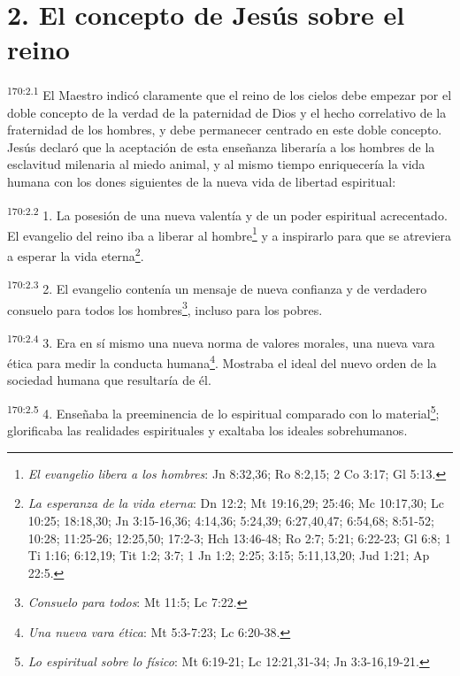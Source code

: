 \section*{2. El concepto de Jesús sobre el reino}
\par
\textsuperscript{170:2.1} El Maestro indicó claramente que el reino de los cielos debe empezar por el doble concepto de la verdad de la paternidad de Dios y el hecho correlativo de la fraternidad de los hombres, y debe permanecer centrado en este doble concepto. Jesús declaró que la aceptación de esta enseñanza liberaría a los hombres de la esclavitud milenaria al miedo animal, y al mismo tiempo enriquecería la vida humana con los dones siguientes de la nueva vida de libertad espiritual:

\par
\textsuperscript{170:2.2} 1. La posesión de una nueva valentía y de un poder espiritual acrecentado. El evangelio del reino iba a liberar al hombre\footnote{\textit{El evangelio libera a los hombres}: Jn 8:32,36; Ro 8:2,15; 2 Co 3:17; Gl 5:13.} y a inspirarlo para que se atreviera a esperar la vida eterna\footnote{\textit{La esperanza de la vida eterna}: Dn 12:2; Mt 19:16,29; 25:46; Mc 10:17,30; Lc 10:25; 18:18,30; Jn 3:15-16,36; 4:14,36; 5:24,39; 6:27,40,47; 6:54,68; 8:51-52; 10:28; 11:25-26; 12:25,50; 17:2-3; Hch 13:46-48; Ro 2:7; 5:21; 6:22-23; Gl 6:8; 1 Ti 1:16; 6:12,19; Tit 1:2; 3:7; 1 Jn 1:2; 2:25; 3:15; 5:11,13,20; Jud 1:21; Ap 22:5.}.

\par
\textsuperscript{170:2.3} 2. El evangelio contenía un mensaje de nueva confianza y de verdadero consuelo para todos los hombres\footnote{\textit{Consuelo para todos}: Mt 11:5; Lc 7:22.}, incluso para los pobres.

\par
\textsuperscript{170:2.4} 3. Era en sí mismo una nueva norma de valores morales, una nueva vara ética para medir la conducta humana\footnote{\textit{Una nueva vara ética}: Mt 5:3-7:23; Lc 6:20-38.}. Mostraba el ideal del nuevo orden de la sociedad humana que resultaría de él.

\par
\textsuperscript{170:2.5} 4. Enseñaba la preeminencia de lo espiritual comparado con lo material\footnote{\textit{Lo espiritual sobre lo físico}: Mt 6:19-21; Lc 12:21,31-34; Jn 3:3-16,19-21.}; glorificaba las realidades espirituales y exaltaba los ideales sobrehumanos.

